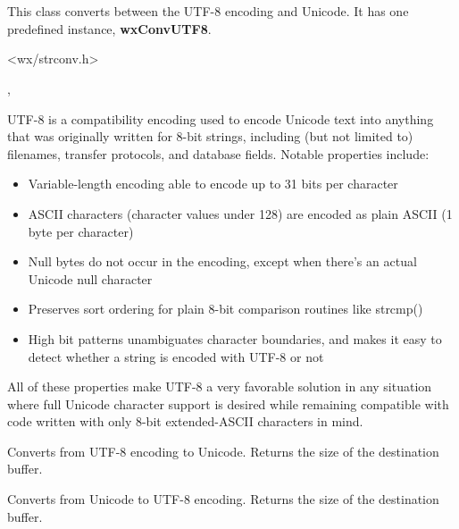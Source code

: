 %
%

\section{}\label{wxmbconvutf8}

This class converts between the UTF-8 encoding and Unicode.
It has one predefined instance, {\bf wxConvUTF8}.




<wx/strconv.h>


, 


UTF-8 is a compatibility encoding used to encode Unicode text into anything that was
originally written for 8-bit strings, including (but not limited to) filenames, transfer
protocols, and database fields. Notable properties include:

\begin{itemize}
\item Variable-length encoding able to encode up to 31 bits per character
\item ASCII characters (character values under 128) are encoded as plain ASCII
(1 byte per character)
\item Null bytes do not occur in the encoding, except when there's an actual Unicode
null character
\item Preserves sort ordering for plain 8-bit comparison routines like strcmp()
\item High bit patterns unambiguates character boundaries, and makes it easy to
detect whether a string is encoded with UTF-8 or not
\end{itemize}

All of these properties make UTF-8 a very favorable solution in any situation
where full Unicode character support is desired while remaining compatible with
code written with only 8-bit extended-ASCII characters in mind.



\label{wxmbconvutf8mb2wc}


Converts from UTF-8 encoding to Unicode. Returns the size of the destination buffer.

\label{wxmbconvutf8wc2mb}


Converts from Unicode to UTF-8 encoding. Returns the size of the destination buffer.

